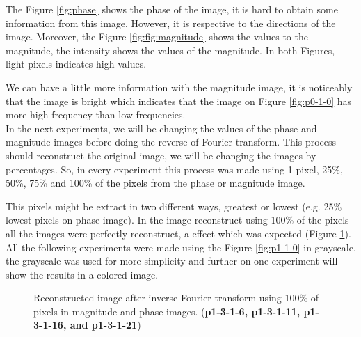 \documentclass[12pt,a4paper]{article}
\begin{document}
The Figure \ref{fig:phase} shows the phase of the image, it is hard to obtain some information from this image. However, it is respective to the directions of the image. Moreover, the Figure \ref{fig:fig:magnitude} shows the values to the magnitude, the intensity shows the values of the magnitude. In both Figures, light pixels indicates high values.

We can have a little more information with the magnitude image, it is noticeably that the image is bright which indicates that the image on Figure \ref{fig:p0-1-0} has more high frequency than low frequencies. \\

In the next experiments, we will be changing the values of the phase and magnitude images before doing the reverse of Fourier transform. This process should reconstruct the original image, we will be changing the images by percentages. So, in every experiment this process was made using 1 pixel, 25\%, 50\%, 75\% and 100\% of the pixels from the phase or magnitude image.

This pixels might be extract in two different ways, greatest or lowest (e.g. 25\% lowest pixels on phase image). In the image reconstruct using 100\% of the pixels all the images were perfectly reconstruct, a effect which was expected (Figure \ref{fig:inverse}). All the following experiments were made using the Figure \ref{fig:p1-1-0} in grayscale, the grayscale was used for more simplicity and further on one experiment will show the results in a colored image.


\begin{figure}[!h]
	\centering
	{%
		\setlength{\fboxsep}{1pt}%
		\setlength{\fboxrule}{1pt}%
	}%
	\caption{Reconstructed image after inverse Fourier transform using 100\% of pixels in magnitude and phase images. (\textbf{p1-3-1-6, p1-3-1-11, p1-3-1-16, and p1-3-1-21})}
	\label{fig:inverse}
\end{figure}
\end{document}
